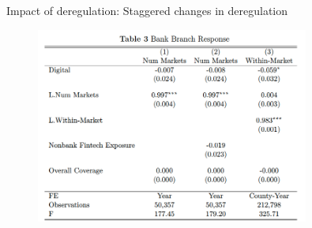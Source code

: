 \documentclass[notes,10pt, aspectratio=169]{beamer}
\begin{document}
    \begin{frame}{Impact of deregulation: Staggered changes in deregulation\hyperlink{sorting_time}{}
        }\label{stag_time}

    \begin{figure}
        \centering
            \includegraphics[width=0.8\textwidth]{imgs/tab3.png}
            \label{fig:my_label}
        \end{figure}
        
        \end{frame}
    
\end{document}

